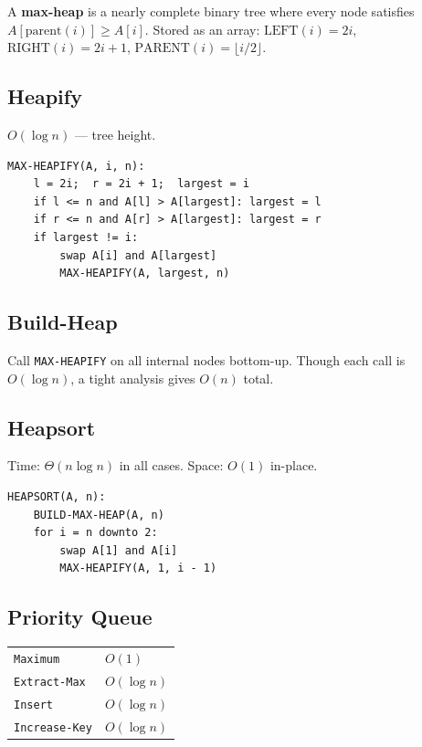 \documentclass[11pt,a4paper,openany]{book}
\begin{document}
\begin{defnbox}[title=Max-heap property]
A \textbf{max-heap} is a nearly complete binary tree where every node satisfies
$A[\text{parent}(i)] \geq A[i]$.
Stored as an array: $\text{LEFT}(i)=2i$, $\text{RIGHT}(i)=2i+1$, $\text{PARENT}(i)=\lfloor i/2\rfloor$.
\end{defnbox}

\subsection{Heapify}
\begin{propbox}[title=Complexity] $O(\log n)$ — tree height. \end{propbox}

\begin{lstlisting}
MAX-HEAPIFY(A, i, n):
    l = 2i;  r = 2i + 1;  largest = i
    if l <= n and A[l] > A[largest]: largest = l
    if r <= n and A[r] > A[largest]: largest = r
    if largest != i:
        swap A[i] and A[largest]
        MAX-HEAPIFY(A, largest, n)
\end{lstlisting}

\subsection{Build-Heap}
Call \texttt{MAX-HEAPIFY} on all internal nodes bottom-up.
Though each call is $O(\log n)$, a tight analysis gives $O(n)$ total.

\subsection{Heapsort}
\begin{propbox}[title=Complexity]
Time: $\Theta(n \log n)$ in all cases. \quad Space: $O(1)$ in-place.
\end{propbox}

\begin{lstlisting}
HEAPSORT(A, n):
    BUILD-MAX-HEAP(A, n)
    for i = n downto 2:
        swap A[1] and A[i]
        MAX-HEAPIFY(A, 1, i - 1)
\end{lstlisting}

\subsection{Priority Queue}
\begin{propbox}
\begin{tabular}{ll}
\texttt{Maximum}     & $O(1)$ \\
\texttt{Extract-Max} & $O(\log n)$ \\
\texttt{Insert}      & $O(\log n)$ \\
\texttt{Increase-Key}& $O(\log n)$ \\
\end{tabular}
\end{propbox}
\end{document}
